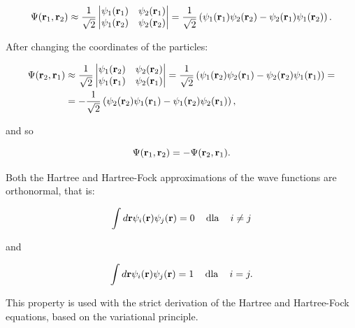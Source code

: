 \begin{equation}
    \label{Eq:fock_wf_2el1}
    \Psi(\mathbf{r}_1, \mathbf{r}_2)\approx\frac{1}{\sqrt{2}}\left|
    \begin{matrix}
        \psi_1(\mathbf{r}_1) & \psi_2(\mathbf{r}_1) \\
        \psi_1(\mathbf{r}_2) & \psi_2(\mathbf{r}_2) 
    \end{matrix}
    \right|=\frac{1}{\sqrt{2}}\left(\psi_1(\mathbf{r}_1)\psi_2(\mathbf{r}_2)-\psi_2(\mathbf{r}_1)\psi_1(\mathbf{r}_2)\right).
\end{equation}

After changing the coordinates of the particles:

\begin{equation}
    \label{Eq:fock_wf_2el2}
    \begin{aligned}
        \Psi(\mathbf{r}_2, \mathbf{r}_1)&\approx\frac{1}{\sqrt{2}}\left|
        \begin{matrix}
        \psi_1(\mathbf{r}_2) & \psi_2(\mathbf{r}_2) \\
        \psi_1(\mathbf{r}_1) & \psi_2(\mathbf{r}_1) 
        \end{matrix}
        \right|=\frac{1}{\sqrt{2}}\left(\psi_1(\mathbf{r}_2)\psi_2(\mathbf{r}_1)-\psi_2(\mathbf{r}_2)\psi_1(\mathbf{r}_1)\right)=\\
        &=-\frac{1}{\sqrt{2}}\left(\psi_2(\mathbf{r}_2)\psi_1(\mathbf{r}_1)-\psi_1(\mathbf{r}_2)\psi_2(\mathbf{r}_1)\right),
    \end{aligned}
\end{equation}

and so

\begin{equation}
    \label{Eq:antysymmetry_fock}
    \Psi(\mathbf{r}_1, \mathbf{r}_2)=-\Psi(\mathbf{r}_2, \mathbf{r}_1).
\end{equation}

Both the Hartree and Hartree-Fock approximations of the wave functions are orthonormal, that is:

\begin{equation}
    \label{Eq:orthogonality}
    \int d\mathbf{r}\psi_i(\mathbf{r})\psi_j(\mathbf{r})=0\;\;\;\text{ dla }\;\;\;i\neq j
\end{equation}

and

\begin{equation}
    \label{Eq:normality}
    \int d\mathbf{r}\psi_i(\mathbf{r})\psi_j(\mathbf{r})=1\;\;\;\text{ dla }\;\;\;i=j.
\end{equation}

This property is used with the strict derivation of the Hartree and Hartree-Fock equations, based on the variational principle.

